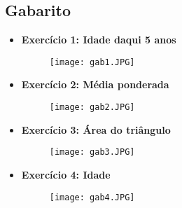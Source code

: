 \documentclass{article}
\begin{document}
\subsection*{Gabarito}
\begin{itemize}
    \item \textbf{Exercício 1: Idade daqui 5 anos}
    \begin{figure}[H]
    \centering
    \texttt{[image: gab1.JPG]}
    \label{fig:gab1.JPG}
    \end{figure}
    \item \textbf{Exercício 2: Média ponderada}
    \begin{figure}[H]
    \centering
    \texttt{[image: gab2.JPG]}
    \label{fig:gab2.JPG}
    \end{figure}
    \item \textbf{Exercício 3: Área do triângulo}
    \begin{figure}[H]
    \centering
    \texttt{[image: gab3.JPG]}
    \label{fig:gab3.JPG}
    \end{figure}
    \item \textbf{Exercício 4: Idade}
    \begin{figure}[H]
    \centering
    \texttt{[image: gab4.JPG]}
    \label{fig:gab4.JPG}
    \end{figure}
\end{itemize}
\end{document}
